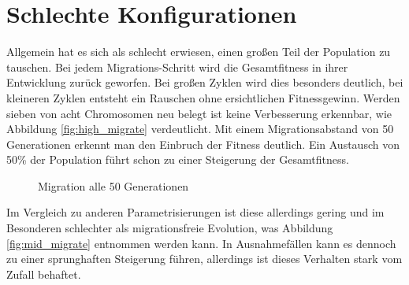 \documentclass[12pt,a4paper]{article}
\begin{document}
\section{Schlechte Konfigurationen}
Allgemein hat es sich als schlecht erwiesen, einen großen Teil der Population zu tauschen. Bei jedem Migrations-Schritt wird die Gesamtfitness in ihrer Entwicklung zurück geworfen. Bei großen Zyklen wird dies besonders deutlich, bei kleineren Zyklen entsteht ein Rauschen ohne ersichtlichen Fitnessgewinn. Werden sieben von acht Chromosomen neu belegt ist keine Verbesserung erkennbar, wie Abbildung \ref{fig:high_migrate} verdeutlicht. Mit einem Migrationsabstand von 50 Generationen erkennt man den Einbruch der Fitness deutlich.
Ein Austausch von 50\% der Population führt schon zu einer Steigerung der Gesamtfitness.
\begin{figure}
\centering
	 \caption{Migration alle 50 Generationen}
\end{figure}
Im Vergleich zu anderen Parametrisierungen ist diese allerdings gering und im Besonderen schlechter als migrationsfreie Evolution, was Abbildung \ref{fig:mid_migrate} entnommen werden kann. In Ausnahmefällen kann es dennoch zu einer sprunghaften Steigerung führen, allerdings ist dieses Verhalten stark vom Zufall behaftet.
\end{document}
